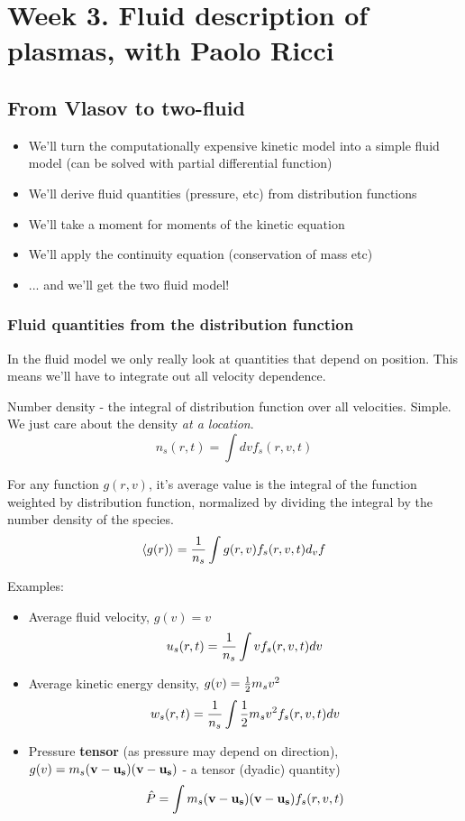 \documentclass[PlasmaNotes.tex]{subfiles}
\begin{document}
\setcounter{section}{2}
\section{Week 3. Fluid description of plasmas, with Paolo Ricci}
\subsection{From Vlasov to two-fluid}

\begin{itemize}
\item We'll turn the computationally expensive kinetic model into a simple fluid model (can be solved with partial differential function)
\item We'll derive fluid quantities (pressure, etc) from distribution functions
\item We'll take a moment for moments of the kinetic equation
\item We'll apply the continuity equation (conservation of mass etc)
\item ... and we'll get the two fluid model!
\end{itemize}

\subsubsection{Fluid quantities from the distribution function}
In the fluid model we only really look at quantities that depend on position. This means we'll have to integrate out all velocity dependence.

Number density - the integral of distribution function over all velocities. Simple. We just care about the density \emph{at a location}.
\[n_s(r,t) = \int{dv f_s(r, v, t)} \]

For any function $g(r, v)$, it's average value is the integral of the function weighted by distribution function, normalized by dividing the integral by the number density of the species.
\[ \left< g(r) \right> = \frac{1}{n_s} \int{g(r, v) f_s(r,v, t) d_v} f \]

Examples:
\begin{itemize}
\item Average fluid velocity, $g(v) = v$
\[ u_s(r,t) = \frac{1}{n_s} \int{v f_s(r,v,t) dv} \]
\item Average kinetic energy density, $g(v) = \frac{1}{2} m_s v^2$
\[ w_s(r,t) = \frac{1}{n_s} \int{ \frac{1}{2} m_s v^2 f_s(r,v,t) dv} \]
\item Pressure \textbf{tensor} (as pressure may depend on direction), $g(v) = m_s (\mathbf{v} -\mathbf{u_s})(\mathbf{v} -\mathbf{u_s})$ - a tensor (dyadic) quantity)
\[ \hat{P} = \int m_s (\mathbf{v} -\mathbf{u_s}) (\mathbf{v} -\mathbf{u_s}) f_s(r,v,t) \]
\end{itemize}
\end{document}

